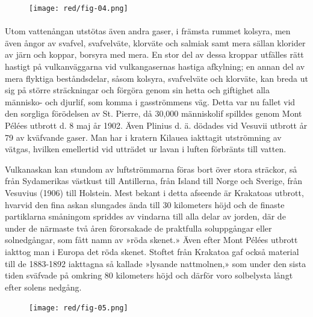 \documentclass[a4paper, 12pt, oneside, swedish]{article}
\begin{document}
\begin{figure}[H]
\centering
\texttt{[image: red/fig-04.png]}
\caption{}
\end{figure}
\paragraph{}
Utom vattenångan utstötas även andra gaser, i främsta rummet kolsyra, men även ångor av svafvel, svafvelväte, klorväte och salmiak samt mera sällan klorider av järn och koppar, borsyra med mera. En stor del av dessa kroppar utfälles rätt hastigt på vulkanväggarna vid vulkangasernas hastiga afkylning; en annan del av mera flyktiga beståndsdelar, såsom kolsyra, svafvelväte och klorväte, kan breda ut sig på större sträckningar och förgöra genom sin hetta och giftighet alla människo- och djurlif, som komma i gasströmmens väg. Detta var nu fallet vid den sorgliga förödelsen av St. Pierre, då 30,000 människolif spilldes genom Mont Pélées utbrott d. 8 maj år 1902. Även Plinius d. ä. dödades vid Vesuvii utbrott år 79 av kväfvande gaser. Man har i kratern Kilauea iakttagit utströmning av vätgas, hvilken emellertid vid utträdet ur lavan i luften förbränts till vatten.

Vulkanaskan kan stundom av luftströmmarna föras bort över stora sträckor, så från Sydamerikas västkust till Antillerna, från Island till Norge och Sverige, från Vesuvius (1906) till Holstein. Mest bekant i detta afseende är Krakatoas utbrott, hvarvid den fina askan slungades ända till 30 kilometers höjd och de finaste partiklarna småningom spriddes av vindarna till alla delar av jorden, där de under de närmaste två åren förorsakade de praktfulla soluppgångar eller solnedgångar, som fått namn av »röda skenet.» Även efter Mont Pélées utbrott iakttog man i Europa det röda skenet. Stoftet från Krakatoa gaf också material till de 1883-1892 iakttagna så kallade »lysande nattmolnen,» som under den sista tiden sväfvade på omkring 80 kilometers höjd och därför voro solbelysta långt efter solens nedgång.

\begin{figure}[H]
\centering
\texttt{[image: red/fig-05.png]}
\caption{}
\end{figure}
\end{document}
